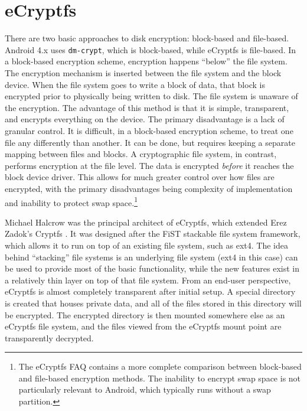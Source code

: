 \section{eCryptfs} 
\label{sec:ecryptfs}
There are two basic approaches to disk encryption: block-based and file-based. Android 4.x uses \texttt{dm-crypt}, which is
block-based, while eCryptfs is file-based.  In a block-based encryption scheme, encryption happens ``below'' the file system. The
encryption mechanism is inserted between the file system and the block device. When the file system goes to write a block of data,
that block is encrypted prior to physically being written to disk. The file system is unaware of the encryption. The advantage of
this method is that it is simple, transparent, and encrypts everything on the device. The primary disadvantage is a lack of granular
control. It is difficult, in a block-based encryption scheme, to treat one file any differently than another.  It can be done, but
requires keeping a separate mapping between files and blocks. A cryptographic file system, in contrast, performs encryption at the
file level. The data is encrypted \emph{before} it reaches the block device driver. This allows for much greater control over how
files are encrypted, with the primary disadvantages being complexity of implementation and inability to protect swap
space.\footnote{The eCryptfs FAQ contains a more complete comparison between block-based and file-based encryption methods. The
inability to encrypt swap space is not particularly relevant to Android, which typically runs without a swap partition.}

Michael Halcrow was the principal architect of eCryptfs, which extended Erez Zadok's Cryptfs \cite{Halcrow}. It was designed after
the FiST stackable file system framework, which allows it to run on top of an existing file system, such as ext4. The idea behind
``stacking'' file systems is an underlying file system (ext4 in this case) can be used to provide most of the basic functionality,
while the new features exist in a relatively thin layer on top of that file system. From an end-user perspective, eCryptfs is almost
completely transparent after initial setup.  A special directory is created that houses private data, and all of the files stored in
this directory will be encrypted. The encrypted directory is then mounted somewhere else as an eCryptfs file system, and the files
viewed from the eCryptfs mount point are transparently decrypted. 

